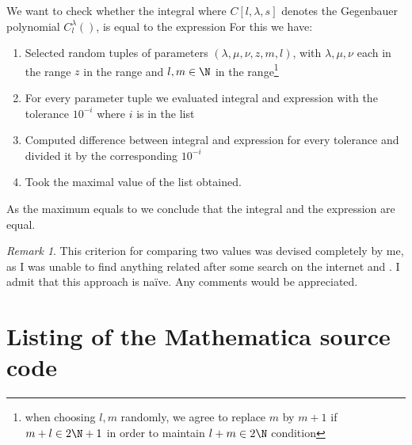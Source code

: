 \documentclass[a4paper]{article}
\theoremstyle{remark}
\newtheorem{remark}{Remark}
\begin{document}
We want to check whether the integral
where $C[l,\lambda,s]$ denotes the Gegenbauer polynomial $C^\lambda_l()$,
is equal to the expression
For this we have:
\begin{enumerate}
	\item 
Selected 
random tuples of parameters $(\lambda,\mu,\nu,z,m,l)$, with $\lambda,\mu,\nu$ each in the range
$z$ in the range
and $l,m\in\N$ in the range\footnote{when choosing $l,m$ randomly, we agree to replace $m$ by $m+1$ if $m+l\in2\N+1$ in order to maintain $l+m\in2\N$ condition}
\item For every parameter tuple we evaluated integral and expression with the tolerance $10^{-i}$ where $i$ is in the list
\item Computed difference between integral and expression for every tolerance and divided it by the corresponding $10^{-i}$
\item Took the maximal value of the list obtained.
\end{enumerate}
As the maximum equals to
we conclude that the integral and the expression are equal.
\begin{remark}
	This criterion for comparing two values was devised completely by me, as I was unable to find anything related after some search on the internet and \cite{teukolsky1992numerical}.
	I admit that this approach is na\"ive. Any comments would be appreciated.
\end{remark}
	\appendix
	\section{Listing of the Mathematica source code}
	
	
	
\end{document}
